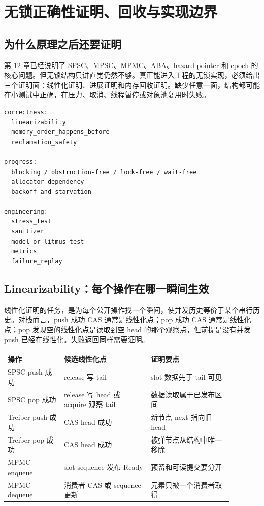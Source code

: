 \chapter{无锁正确性证明、回收与实现边界}

\section{为什么原理之后还要证明}

第 12 章已经说明了 SPSC、MPSC、MPMC、ABA、hazard pointer 和 epoch 的核心问题。但无锁结构只讲直觉仍然不够。真正能进入工程的无锁实现，必须给出三个证明面：线性化证明、进展证明和内存回收证明。缺少任意一面，结构都可能在小测试中正确，在压力、取消、线程暂停或对象池复用时失败。

\begin{lstlisting}[numbers=none,caption={无锁实现的三份证明}]
correctness:
  linearizability
  memory_order_happens_before
  reclamation_safety

progress:
  blocking / obstruction-free / lock-free / wait-free
  allocator_dependency
  backoff_and_starvation

engineering:
  stress_test
  sanitizer
  model_or_litmus_test
  metrics
  failure_replay
\end{lstlisting}

\section{Linearizability：每个操作在哪一瞬间生效}

线性化证明的任务，是为每个公开操作找一个瞬间，使并发历史等价于某个串行历史。对栈而言，push 成功 CAS 通常是线性化点；pop 成功 CAS 通常是线性化点；pop 发现空的线性化点是读取到空 head 的那个观察点，但前提是没有并发 push 已经在线性化。失败返回同样需要证明。

\begin{center}
\small
\begin{tabular}{p{0.22\linewidth}p{0.34\linewidth}p{0.32\linewidth}}
\toprule
操作 & 候选线性化点 & 证明要点 \\
\midrule
SPSC push 成功 & release 写 tail & slot 数据先于 tail 可见 \\
SPSC pop 成功 & release 写 head 或 acquire 观察 tail & 数据读取属于已发布区间 \\
Treiber push 成功 & CAS head 成功 & 新节点 next 指向旧 head \\
Treiber pop 成功 & CAS head 成功 & 被弹节点从结构中唯一移除 \\
MPMC enqueue & slot sequence 发布 Ready & 预留和可读提交要分开 \\
MPMC dequeue & 消费者 CAS 或 sequence 更新 & 元素只被一个消费者取得 \\
\bottomrule
\end{tabular}
\end{center}

